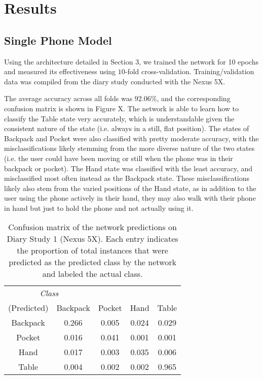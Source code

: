 \section{Results}
\subsection{Single Phone Model}
Using the architecture detailed in Section 3, we trained the network for 10 epochs
and measured its effectiveness using $10$-fold cross-validation.
Training/validation data was compiled from the diary study conducted with the Nexus 5X.

The average accuracy across all folds was $92.06\%$, and the corresponding
confusion matrix is shown in Figure X. The network is able to learn how to 
classify the Table state very accurately, which is understandable given 
the consistent nature of the state (i.e. always in a still, flat position). The states
of Backpack and Pocket were also classified with pretty moderate accuracy,
with the misclassifications likely stemming from the more diverse nature of 
the two states (i.e. the user could have been moving or still when the phone was
in their backpack or pocket). The Hand state was classified with the least accuracy,
and misclassified most often instead as the Backpack state. These misclassifications
likely also stem from the varied positions of the Hand state, as in addition to the user
using the phone actively in their hand, they may also walk with their phone in hand
but just to hold the phone and not actually using it.


\begin{table}[h]
\caption{Confusion matrix of the network predictions on Diary Study 1 (Nexus 5X). Each entry indicates the proportion of
total instances that were predicted as the predicted class by the network and labeled the actual class.}\label{fig:confusion} \centering
\begin{tabular}{| c || c | c | c | c }  
\toprule
\multicolumn{2}{c}{\textit{Class}}\multicolumn{3}{c}{(Actual)} \\ \cmidrule{1-5}
(Predicted)		&	Backpack    & 	Pocket 	& 	Hand	&	Table \\
\midrule
Backpack			&	0.266 	&	0.005	&	0.024 	&	0.029 \\
Pocket			&	0.016 	&	0.041 	&	0.001 	&	0.001 \\
Hand			&	0.017 	&	0.003 	&	0.035 	&	0.006 \\
Table			&	0.004 	&	0.002 	&	0.002 	&	0.965\\
\bottomrule
\end{tabular}
\end{table}



